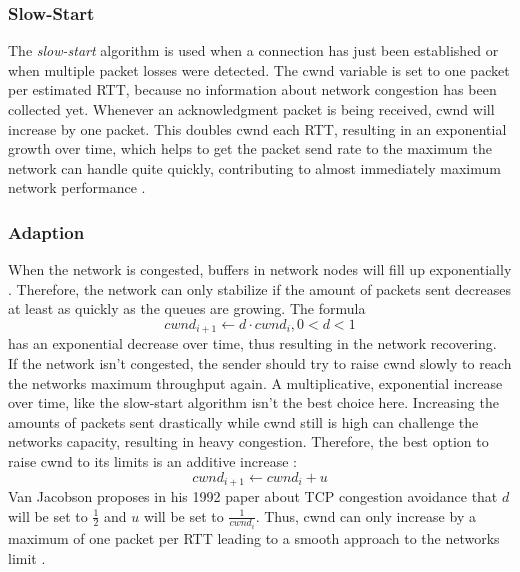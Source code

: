 \documentclass[a4paper,conference]{IEEEtran}
\begin{document}
\subsubsection*{Slow-Start}
The \textit{slow-start} algorithm is used when a connection has just been established or when multiple packet losses were detected. The cwnd variable is set to one packet per estimated RTT, because no information about network congestion has been collected yet. Whenever an acknowledgment packet is being received, cwnd will increase by one packet. This doubles cwnd each RTT, resulting in an exponential growth over time, which helps to get the packet send rate to the maximum the network can handle quite quickly, contributing to almost immediately maximum network performance \cite{jacobson1992tcp}.

\subsubsection*{Adaption}
When the network is congested, buffers in network nodes will fill up exponentially \cite{jacobson1992tcp}. Therefore, the network can only stabilize if the amount of packets sent decreases at least as quickly as the queues are growing. The formula \cite{jacobson1992tcp} \[cwnd_{i+1} \leftarrow d \cdot cwnd_{i}, 0<d<1\] has an exponential decrease over time, thus resulting in the network recovering.\\
If the network isn't congested, the sender should try to raise cwnd slowly to reach the networks maximum throughput again. A multiplicative, exponential increase over time, like the slow-start algorithm isn't the best choice here. Increasing the amounts of packets sent drastically while cwnd still is high can challenge the networks capacity, resulting in heavy congestion. Therefore, the best option to raise cwnd to its limits is an additive increase \cite{jacobson1992tcp}:\[cwnd_{i+1} \leftarrow cwnd_{i} + u\] Van Jacobson proposes in his 1992 paper about TCP congestion avoidance that $d$ will be set to $\frac{1}{2}$ and $u$ will be set to $\frac{1}{cwnd_{i}}$. Thus, cwnd can only increase by a maximum of one packet per RTT leading to a smooth approach to the networks limit \cite{jacobson1992tcp}.
\end{document}
